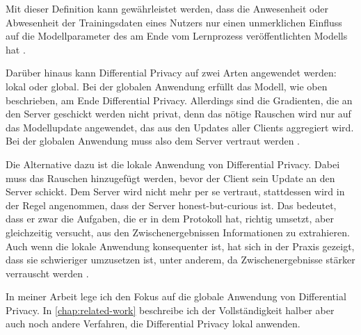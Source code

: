 Mit dieser Definition kann gewährleistet werden, dass die Anwesenheit oder Abwesenheit der Trainingsdaten eines Nutzers nur einen unmerklichen Einfluss auf die Modellparameter des am Ende vom Lernprozess veröffentlichten Modells hat \cite{mcmahan:2018}.

Darüber hinaus kann Differential Privacy auf zwei Arten angewendet werden: lokal oder global. Bei der globalen Anwendung erfüllt das Modell, wie oben beschrieben, am Ende Differential Privacy. Allerdings sind die Gradienten, die an den Server geschickt werden nicht privat, denn das nötige Rauschen wird nur auf das Modellupdate angewendet, das aus den Updates aller Clients aggregiert wird. Bei der globalen Anwendung muss also dem Server vertraut werden \cite[p.44]{kairouz:2021}.

Die Alternative dazu ist die lokale Anwendung von Differential Privacy. Dabei muss das Rauschen hinzugefügt werden, bevor der Client sein Update an den Server schickt. Dem Server wird nicht mehr per se vertraut, stattdessen wird in der Regel angenommen, dass der Server \glqq{}honest-but-curious\grqq{} ist. Das bedeutet, dass er zwar die Aufgaben, die er in dem Protokoll hat, richtig umsetzt, aber gleichzeitig versucht, aus den Zwischenergebnissen Informationen zu extrahieren. Auch wenn die lokale Anwendung konsequenter ist, hat sich in der Praxis gezeigt, dass sie schwieriger umzusetzen ist, unter anderem, da Zwischenergebnisse stärker verrauscht werden \cite[p.54]{kairouz:2021}.

In meiner Arbeit lege ich den Fokus auf die globale Anwendung von Differential Privacy. In \autoref{chap:related-work} beschreibe ich der Vollständigkeit halber aber auch noch andere Verfahren, die Differential Privacy lokal anwenden.